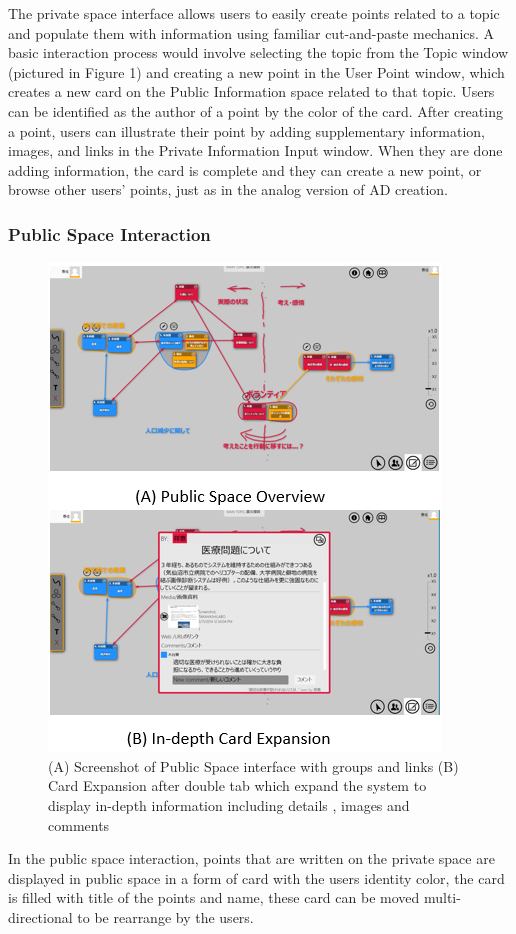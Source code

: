 \documentclass{sigchi}
\begin{document}
\begin{itemize}
The private space interface allows users to easily create points related to a topic and populate them with information using familiar cut-and-paste mechanics. A basic interaction process would involve selecting the topic from the Topic window (pictured in Figure 1) and creating a new point in the User Point window, which creates a new card on the Public Information space related to that topic. Users can be identified as the author of a point by the color of the card. After creating a point, users can illustrate their point by adding supplementary information, images, and links in the Private Information Input window. When they are done adding information, the card is complete and they can create a new point, or browse other users' points, just as in the analog version of AD creation.

\subsubsection{Public Space Interaction}

\begin{figure}[!h]
\centering
\includegraphics[width=1.0\columnwidth]{public4}
\caption{(A) Screenshot of Public Space interface with groups and links (B) Card Expansion after double tab which expand the system to display in-depth information including details , images and comments}
\label{fig:figure1}
\end{figure}
In the public space interaction, points that are written on the private space are displayed in public space in a form of card with the users identity color, the card is filled with title of the points and name, these card can be moved multi-directional to be rearrange by the users.


\end{itemize}
\end{document}
